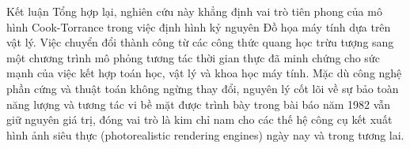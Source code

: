 \documentclass[11pt, aspectratio=169]{beamer}
\begin{document}
\begin{frame}{Kết luận}
	Tổng hợp lại, nghiên cứu này khẳng định vai trò tiên phong của mô hình Cook-Torrance trong việc định hình kỷ nguyên Đồ họa máy tính dựa trên vật lý. Việc chuyển đổi thành công từ các công thức quang học trừu tượng sang một chương trình mô phỏng tương tác thời gian thực đã minh chứng cho sức mạnh của việc kết hợp toán học, vật lý và khoa học máy tính. Mặc dù công nghệ phần cứng và thuật toán không ngừng thay đổi, nguyên lý cốt lõi về sự bảo toàn năng lượng và tương tác vi bề mặt được trình bày trong bài báo năm 1982 vẫn giữ nguyên giá trị, đóng vai trò là kim chỉ nam cho các thế hệ công cụ kết xuất hình ảnh siêu thực (photorealistic rendering engines) ngày nay và trong tương lai.
\end{frame}




%    
\end{document}
